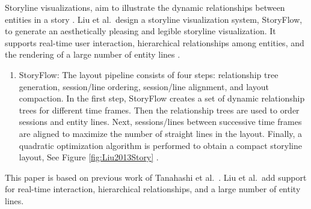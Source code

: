 \documentclass{egpubl}
\begin{document}
%
Storyline visualizations, aim to illustrate the dynamic relationships between entities in a story \cite{shixia}.
Liu et al.\ design a storyline visualization system, StoryFlow, to generate an aesthetically pleasing and legible storyline visualization. It supports real-time user interaction, hierarchical relationships among entities, and the rendering of a large number of entity lines \cite{shixia}.
\begin{enumerate}
\item StoryFlow: The layout pipeline consists of four steps: relationship tree generation, session/line ordering, session/line alignment, and layout compaction. In the first step, StoryFlow creates a set of dynamic relationship trees for different time frames. Then the relationship trees are used to order sessions and entity lines. Next, sessions/lines between successive time frames are aligned to maximize the number of straight lines in the layout. Finally, a quadratic optimization algorithm is performed to obtain a compact storyline layout, See Figure \ref{fig:Liu2013Story} \cite{shixia}.
\end{enumerate}
This paper is based on previous work of Tanahashi et al.\ \cite{Tanahashi}. Liu et al.\ add support for real-time interaction, hierarchical relationships, and a large number of entity lines. 
\end{document}
